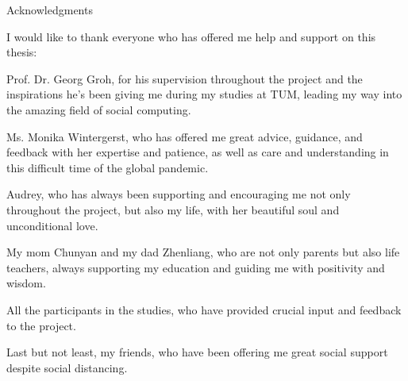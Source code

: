 \thispagestyle{empty}

\vspace*{20mm}

\begin{center}
{ Acknowledgments}
\end{center}

\vspace{10mm}

\indent I would like to thank everyone who has offered me help and support on this thesis:\bigskip

\indent Prof. Dr. Georg Groh, for his supervision throughout the project and
the inspirations he's been giving me during my studies at TUM, leading my way
into the amazing field of social computing.\bigskip

\indent Ms. Monika Wintergerst, who has offered me great advice, guidance, and feedback with her expertise and patience, as well as care and understanding in this difficult time of the global pandemic.\bigskip

\indent Audrey, who has always been supporting and encouraging me not only throughout the project, but also my life, with her beautiful soul and unconditional love.\bigskip

\indent My mom Chunyan and my dad Zhenliang, who are not only parents but also life teachers,
always supporting my education and guiding me with positivity and wisdom.\bigskip

\indent All the participants in the studies, who have provided crucial input and feedback
to the project.\bigskip

\indent Last but not least, my friends, who have been offering me great social support despite social distancing.

\cleardoublepage{}
